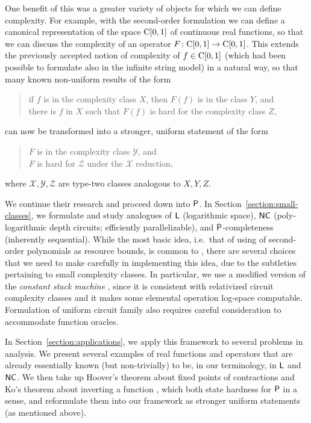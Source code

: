 \documentclass[envcountsect,envcountsame,orivec,oribibl]{llncs}
\begin{document}
One benefit of this was
a greater variety of objects for which we can define complexity. 
For example, with the second-order formulation
we can define a canonical representation of the space $\mathrm C [0, 1]$
of continuous real functions, 
so that we can discuss the complexity of an
operator $F \colon \mathrm C [0, 1] \to \mathrm C [0, 1]$. 
This extends the previously accepted notion of 
complexity of $f \in \mathrm C [0, 1]$
(which had been possible to formulate also in the infinite string model)
in a natural way, so that many known non-uniform results of the form
\begin{quote}
 if $f$ is in the complexity class $X$,
 then $F(f)$ is in the class $Y$, and \\
 there is $f$ in $X$ such that $F(f)$ is hard for
 the complexity class $Z$, 
\end{quote}
can now be transformed into a stronger, uniform statement of the form
\begin{quote}
 $F$ is in the complexity class $\mathcal Y$, and \\
 $F$ is hard for $\mathcal Z$ under the $\mathcal X$ reduction,
\end{quote}
where $\mathcal{X, Y, Z}$ are type-two classes analogous to ${X, Y, Z}$.

We continue their research and proceed down into $\mathsf{P}$. 
In Section~\ref{section:small-classes}, 
we formulate and study analogues of 
$\mathsf{L}$ (logarithmic space), 
$\mathsf{NC}$ (poly-logarithmic depth circuits; efficiently parallelizable), 
and 
$\mathsf{P}$-completeness (inherently sequential). 
While the most basic idea, 
i.e.\ that of using of second-order polynomials as resource bounds, 
is common to \cite{kawamura2012complexity}, 
there are several choices that we need to make carefully
in implementing this idea, 
due to the subtleties pertaining to small complexity classes. 
In particular, 
we use a modified version of 
the \emph{constant stack machine} \cite{aehlig2007relativizing}, 
since it is consistent with relativized circuit complexity classes 
and it makes some elemental operation log-space computable.
Formulation of uniform circuit family
also requires careful consideration to 
accommodate function oracles. 

In Section~\ref{section:applications}, 
we apply this framework to several problems in analysis.
We present several examples of real functions and operators 
that are already essentially known (but non-trivially) to be, 
in our terminology, 
in $\mathsf{L}$ and $\mathsf{NC}$. 
We then take up
Hoover's theorem about fixed points of contractions \cite{hoover1991real}
and Ko's theorem about inverting a function \cite{ko1991complexity}, 
which both state hardness for $\mathsf{P}$ in a sense, 
and reformulate them into our framework
as stronger uniform statements (as mentioned above).
\end{document}
